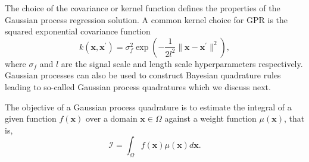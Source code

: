 \documentclass[10pt]{article}
\begin{document}
	The choice of the covariance or kernel function defines the properties of the Gaussian process regression solution. A common kernel choice for GPR is the squared exponential covariance function \citep{Rasmussen2006GPforML}
	\begin{equation}
		k\left(\mathbf{x},\mathbf{x}^\prime\right)=\sigma_{f}^{2}\exp\left(-\frac{1}{2l^{2}}\|\mathbf{x} - \mathbf{x}^\prime\|^2\right),
		\label{eq: squared exp kernel}
	\end{equation}
	where $\sigma_{f}$ and $l$ are the signal scale and length scale hyperparameters respectively. 
	Gaussian processes can also be used to construct Bayesian quadrature rules leading to so-called Gaussian process quadratures \citep{Minka2000QuadraturesGPR, Hennig2022ProbabilisticNumerics} which we discuss next.
	
	
	
	
	
	
	
	
	
	The objective of a Gaussian process quadrature is to estimate the integral of a given function $f(\mathbf{x})$ over a domain $\mathbf{x} \in \Omega$ against a weight function $\mu(\mathbf{x})$, that is,
	\begin{equation}
		\mathcal{I} = \int_\Omega f(\mathbf{x})\mu(\mathbf{x}) d\mathbf{x}.
	\end{equation}
	
\end{document}
